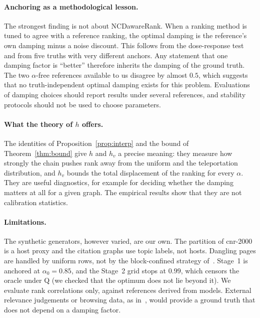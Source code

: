 \documentclass[11pt,a4paper]{article}
\theoremstyle{definition}
\theoremstyle{remark}
\begin{document}
\paragraph{Anchoring as a methodological lesson.} The strongest finding is not about NCDawareRank. When a
ranking method is tuned to agree with a reference ranking, the optimal damping is the reference's own
damping minus a noise discount. This follows from the dose-response test and from five truths with
very different anchors. Any statement that one damping factor is ``better'' therefore inherits the
damping of the ground truth. The two $\alpha$-free references available to us disagree by almost
$0.5$, which suggests that no truth-independent optimal damping exists for this problem. Evaluations
of damping choices should report results under several references, and stability protocols should not
be used to choose parameters.

\paragraph{What the theory of $h$ offers.} The identities of Proposition~\ref{prop:interp} and the bound
of Theorem~\ref{thm:bound} give $h$ and $h_v$ a precise meaning: they measure how strongly the chain
pushes rank away from the uniform and the teleportation distribution, and $h_v$ bounds the total
displacement of the ranking for every $\alpha$. They are useful diagnostics, for example for deciding
whether the damping matters at all for a given graph. The empirical results show that they are not
calibration statistics.

\paragraph{Limitations.} The synthetic generators, however varied, are our own. The partition of
cnr-2000 is a host proxy and the citation graphs use topic labels, not hosts. Dangling pages are handled
by uniform rows, not by the block-confined strategy of~\cite{ng20}. Stage~1 is anchored at
$\alpha_0=0.85$, and the Stage~2 grid stops at $0.99$, which censors the oracle under Q (we checked that
the optimum does not lie beyond it). We evaluate rank correlations only, against references derived from
models. External relevance judgements or browsing data, as in~\cite{gleich10}, would provide a ground
truth that does not depend on a damping factor.

\end{document}
